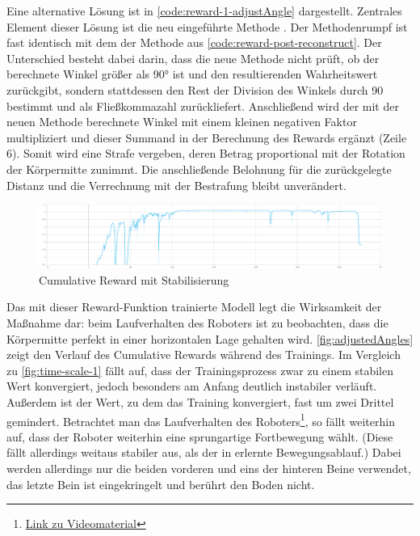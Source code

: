 \begin{figure}
    
\end{figure}

Eine alternative Lösung ist in \autoref{code:reward-1-adjustAngle} dargestellt.
Zentrales Element dieser Lösung ist die neu eingeführte Methode .
Der Methodenrumpf ist fast identisch mit dem der Methode  aus \autoref{code:reward-post-reconstruct}.
Der Unterschied besteht dabei darin, dass die neue Methode nicht prüft, ob der berechnete Winkel größer als 90° ist und den resultierenden Wahrheitswert zurückgibt, sondern stattdessen den Rest der Division des Winkels durch 90 bestimmt und als Fließkommazahl zurückliefert.
Anschließend wird der mit der neuen Methode berechnete Winkel mit einem kleinen negativen Faktor multipliziert und dieser Summand in der Berechnung des Rewards ergänzt (Zeile 6).
Somit wird eine Strafe vergeben, deren Betrag proportional mit der Rotation der Körpermitte zunimmt.
Die anschließende Belohnung für die zurückgelegte Distanz und die Verrechnung mit der Bestrafung bleibt unverändert.

\begin{figure}
    \centering
    \includegraphics[width=\textwidth]{Bilder/ml-agents/Environment_Cumulative Reward_adjustedAngles.pdf}
    \caption{Cumulative Reward mit Stabilisierung}
    \label{fig:adjustedAngles}
\end{figure}

Das mit dieser Reward-Funktion trainierte Modell legt die Wirksamkeit der Maßnahme dar: beim Laufverhalten des Roboters ist zu beobachten, dass die Körpermitte perfekt in einer horizontalen Lage gehalten wird.
\autoref{fig:adjustedAngles} zeigt den Verlauf des Cumulative Rewards während des Trainings.
Im Vergleich zu \autoref{fig:time-scale-1} fällt auf, dass der Trainingsprozess zwar zu einem stabilen Wert konvergiert, jedoch besonders am Anfang deutlich instabiler verläuft.
Außerdem ist der Wert, zu dem das Training konvergiert, fast um zwei Drittel gemindert.
Betrachtet man das Laufverhalten des Roboters\footnote{\href{https://github.com/yschiebelhut/studienarbeit-doc/raw/master/Videos/SpiderBotDemos/adjustedAngles.webm}{Link zu Videomaterial}}, so fällt weiterhin auf, dass der Roboter weiterhin eine sprungartige Fortbewegung wählt.
(Diese fällt allerdings weitaus stabiler aus, als der in \cite{waidner.2020} erlernte Bewegungsablauf.)
Dabei werden allerdings nur die beiden vorderen und eins der hinteren Beine verwendet, das letzte Bein ist eingekringelt und berührt den Boden nicht.

